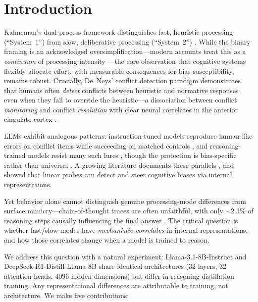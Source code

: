 \documentclass[accepted]{article}
\begin{document}

\section{Introduction}
\label{sec:intro}

Kahneman's dual-process framework distinguishes fast, heuristic
processing (``System~1'') from slow, deliberative processing
(``System~2'') \citep{kahneman2011thinking}.  While the binary framing
is an acknowledged oversimplification---modern accounts treat this as a
\emph{continuum} of processing intensity \citep{melnikoff2018mythical,
evans2013dual, deneys2023advancing}---the core observation that
cognitive systems flexibly allocate effort, with measurable consequences
for bias susceptibility, remains robust.  Crucially, De~Neys' conflict
detection paradigm \citep{deneys2012bias, deneys2017dual} demonstrates
that humans often \emph{detect} conflicts between heuristic and
normative responses even when they fail to override the heuristic---a
dissociation between conflict \emph{monitoring} and conflict
\emph{resolution} with clear neural correlates in the anterior cingulate
cortex \citep{botvinick2001conflict}.

LLMs exhibit analogous patterns: instruction-tuned models reproduce
human-like errors on conflict items while succeeding on matched controls
\citep{hagendorff2023human}, and reasoning-trained models resist many
such lures \citep{deepseekr1}, though the protection is bias-specific
rather than universal \citep{schwartz2025clinical}.  A growing literature
documents these parallels \citep{xie2025cogsci, codaforno2025dual,
ziabari2025reasoning}, and \citet{huang2026cogbias} showed that linear
probes can detect and steer cognitive biases via internal representations.

Yet behavior alone cannot distinguish genuine processing-mode differences
from surface mimicry---chain-of-thought traces are often unfaithful,
with only ${\sim}2.3$\% of reasoning steps causally influencing the
final answer \citep{jiang2025aha, lanham2023measuring,
boppana2026reasoning}.  The critical question is whether fast/slow modes
have \emph{mechanistic correlates} in internal representations, and how
those correlates change when a model is trained to reason.

We address this question with a natural experiment: Llama-3.1-8B-Instruct
and DeepSeek-R1-Distill-Llama-8B share identical architectures (32
layers, 32 attention heads, 4096 hidden dimensions) but differ in
reasoning distillation training.  Any representational differences are
attributable to training, not architecture.  We make five contributions:
\end{document}
